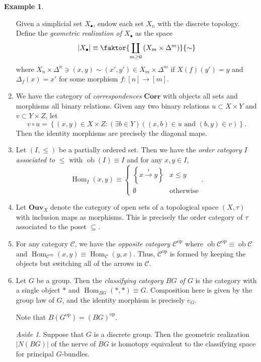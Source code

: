 \documentclass[10pt,letterpaper,cm]{nupset}
\theoremstyle{definition}
\newtheorem{exmp}[definition]{Example}
\theoremstyle{theorem}
\theoremstyle{remark}
\newtheorem*{aside}{Aside}
\newcommand{\1}{\mathbf{1}}
\renewcommand{\c}{\mathscr{C}}
\newcommand{\0}{\vec 0}
\DeclareMathOperator{\op}{op}
\DeclareMathOperator{\ob}{ob}
\DeclareMathOperator{\Hom}{Hom}
\begin{document}
\begin{exmp}
\begin{enumerate}
Given a simplicial set $X_{\bullet}$, endow each set $X_n$ with the discrete topology. Define the \textit{geometric realization of $X_{\bullet}$} as the space $$\left\lvert{X_{\bullet}}\right\rvert \equiv \faktor{\coprod_{m\geq 0}{\left(X_m \times \Delta^m\right)}}{\sim}$$ where $X_n \times \Delta^n \ni \left(x, y\right)\sim \left(x', y'\right) \in X_m \times \Delta^m$ if $X(f)(y') = y$ and $\Delta_f(x) = x'$ for some morphism $f: [n] \to [m]$.  
\item  We have the category of  \textit{correspondences} $\mathbf{Corr}$ with objects all sets and morphisms all binary relations. Given any two binary relations $u\subset X\times Y$ and $v \subset Y \times Z$, let
 $$v \circ u = \left\{(x, y) \in X \times Z : \left(\exists b \in Y\right)\left((x, b) \in u \text{ and }(b, y) \in v\right)\right\}.$$ Then the identity morphisms are precisely the diagonal maps.
\item Let $\left(I, \leq \right)$ be a partially ordered set. Then we have the \textit{order category $I$ associated to $\leq$} with $\ob(I) \equiv I$ and for any $x,y\in I$,
\[
\Hom_I(x,y) \equiv 
\begin{cases} 
\left\{x\overset{i}{\rightarrow} y\right\} & x\leq y
\\ \emptyset & \text{otherwise}
\end{cases}.
\]
\item Let $\mathbf{Ouv}_X$ denote the category of open sets of a topological space $\left(X, \tau\right)$ with inclusion maps as morphisms.
 This is precisely the order category of $\tau$ associated to the poset $\subseteq$. 
 \item For any category $\c$, we have the \textit{opposite category $\c^{\op}$} where $\ob{\c^{\op}} \equiv \ob{\c}$ and $\Hom_{\c^{\op}}(x,y) \equiv \Hom_{\c}(y,x)$. Thus, $\c^{\op}$ is formed by keeping the objects but switching all of the arrows in $\c$.
\item Let $G$ be a group. Then the \textit{classifying category $B{G}$ of $G$} is the category with a single object $\ast$ and $\Hom_{B{G}}(\ast, \ast) \equiv G$. Composition here is given by the group law of $G$, and the identity morphism is precisely $e_G$. 

Note that $B\left(G^{\op}\right) =\left(BG\right)^{\op}$.

\begin{aside}
Suppose that $G$ is a discrete group. Then the geometric realization $\left\lvert{N(B{G})}\right\rvert$ of the nerve  of $B{G}$ is homotopy equivalent to the classifying space for principal $G$-bundles.
\end{aside}
\end{enumerate}
\end{exmp}
\end{document}
